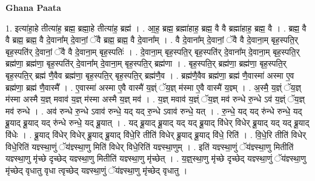 \documentclass[17pt]{extarticle}
\begin{document}
\textbf{Ghana Paata } \newline

1. इत्या॑हा॒हे तीत्या॑ह॒ ब्रह्म॒ ब्रह्मा॒हे तीत्या॑ह॒ ब्रह्म॑ । . आ॒ह॒ ब्रह्म॒ ब्रह्मा॑हाह॒ ब्रह्म॒ वै वै ब्रह्मा॑हाह॒ ब्रह्म॒ वै । . ब्रह्म॒ वै वै ब्रह्म॒ ब्रह्म॒ वै दे॒वाना᳚म् दे॒वानां॒ ॅवै ब्रह्म॒ ब्रह्म॒ वै दे॒वाना᳚म् । . वै दे॒वाना᳚म् दे॒वानां॒ ॅवै वै दे॒वाना॒म् बृह॒स्पति॒र् बृह॒स्पति॑र् दे॒वानां॒ ॅवै वै दे॒वाना॒म् बृह॒स्पतिः॑ । . दे॒वाना॒म् बृह॒स्पति॒र् बृह॒स्पति॑र् दे॒वाना᳚म् दे॒वाना॒म् बृह॒स्पति॒र् ब्रह्म॑णा॒ ब्रह्म॑णा॒ बृह॒स्पति॑र् दे॒वाना᳚म् दे॒वाना॒म् बृह॒स्पति॒र् ब्रह्म॑णा । . बृह॒स्पति॒र् ब्रह्म॑णा॒ ब्रह्म॑णा॒ बृह॒स्पति॒र् बृह॒स्पति॒र् ब्रह्म॑ णै॒वैव ब्रह्म॑णा॒ बृह॒स्पति॒र् बृह॒स्पति॒र् ब्रह्म॑णै॒व । . ब्रह्म॑णै॒वैव ब्रह्म॑णा॒ ब्रह्म॑ णै॒वास्मा॑ अस्मा ए॒व ब्रह्म॑णा॒ ब्रह्म॑ णै॒वास्मै᳚ । . ए॒वास्मा॑ अस्मा ए॒वै वास्मै॑ य॒ज्ञ्ं ॅय॒ज्ञ् म॑स्मा ए॒वै वास्मै॑ य॒ज्ञ्म् । . अ॒स्मै॒ य॒ज्ञ्ं ॅय॒ज्ञ् म॑स्मा अस्मै य॒ज्ञ् मवाव॑ य॒ज्ञ् म॑स्मा अस्मै य॒ज्ञ् मव॑ । . य॒ज्ञ् मवाव॑ य॒ज्ञ्ं ॅय॒ज्ञ् मव॑ रुन्धे रु॒न्धे ऽव॑ य॒ज्ञ्ं ॅय॒ज्ञ् मव॑ रुन्धे । . अव॑ रुन्धे रु॒न्धे ऽवाव॑ रुन्धे॒ यद् यद् रु॒न्धे ऽवाव॑ रुन्धे॒ यत् । . रु॒न्धे॒ यद् यद् रु॑न्धे रुन्धे॒ यद् ब्रू॒याद् ब्रू॒याद् यद् रु॑न्धे रुन्धे॒ यद् ब्रू॒यात् । . यद् ब्रू॒याद् ब्रू॒याद् यद् यद् ब्रू॒याद् वि॑धेर् विधेर् ब्रू॒याद् यद् यद् ब्रू॒याद् वि॑धेः । . ब्रू॒याद् वि॑धेर् विधेर् ब्रू॒याद् ब्रू॒याद् वि॑धे॒रि तीति॑ विधेर् ब्रू॒याद् ब्रू॒याद् वि॑धे॒ रिति॑ । . वि॒धे॒रि तीति॑ विधेर् विधे॒रिति॑ यज्ञ्स्था॒णुं ॅय॑ज्ञ्स्था॒णु मिति॑ विधेर् विधे॒रिति॑ यज्ञ्स्था॒णुम् । . इति॑ यज्ञ्स्था॒णुं ॅय॑ज्ञ्स्था॒णु मितीति॑ यज्ञ्स्था॒णु मृ॑च्छे दृच्छेद् यज्ञ्स्था॒णु मितीति॑ यज्ञ्स्था॒णु मृ॑च्छेत् । . य॒ज्ञ्॒स्था॒णु मृ॑च्छे दृच्छेद् यज्ञ्स्था॒णुं ॅय॑ज्ञ्स्था॒णु मृ॑च्छेद् वृधातु वृधा त्वृच्छेद् यज्ञ्स्था॒णुं ॅय॑ज्ञ्स्था॒णु मृ॑च्छेद् वृधातु । \newline
\end{document}
